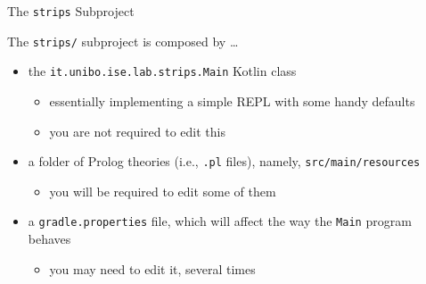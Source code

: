 \documentclass[presentation]{beamer}\mode<presentation>{\usetheme{AMSBolognaFC}}
\begin{document}
\begin{frame}{The \texttt{strips} Subproject}

The \texttt{strips/} subproject is composed by \ldots{}
%
\vfill
%
\begin{itemize}
    \item the \texttt{it.unibo.ise.lab.strips.\alert{Main}} Kotlin class
    \begin{itemize}
		\item essentially implementing a simple REPL with some handy defaults
        \item you are not required to edit this
    \end{itemize}

    \vfill

    \item a folder of Prolog theories (i.e., \texttt{.pl} files), namely, \texttt{src/main/\alert{resources}}
    \begin{itemize}
        \item you will be required to edit some of them
    \end{itemize}

    \vfill

    \item a \texttt{gradle\alert{.properties}} file, which will affect the way the \texttt{Main} program behaves
    \begin{itemize}
        \item you may need to edit it, several times
    \end{itemize}
\end{itemize}
\end{frame}
\end{document}
